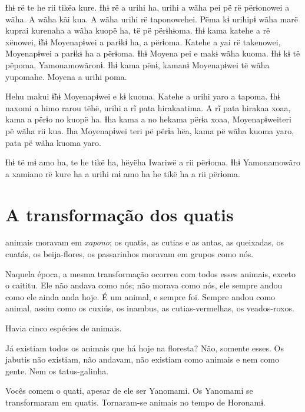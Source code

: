 Ɨhɨ rë te he rii tikëa kure. Ɨhɨ rë a urihi ha, urihi a wãha pei pë rë
 përɨonowei a wãha. A wãha kãi kua. A wãha urihi rë taponowehei. Pëma kɨ
 urihipɨ wãha marë kuprai kurenaha a wãha kuopë ha, të pë përɨhɨoma. Ɨhɨ
 kama katehe a rë xënowei, ɨ̃hɨ Moyenapɨwei a parɨkɨ ha, a përɨoma. Katehe
 a yai rë takenowei, Moyenapɨwei a parɨkɨ ha a përɨoma. Ɨhɨ Moyena pei e
 makɨ wãha kuoma. Ɨhɨ kɨ të pëpoma, Yamonamowãronɨ. Ɨhɨ kama pënɨ, kamanɨ
 Moyenapɨwei të wãha yupomahe. Moyena a urihi poma. 

Hehu makui ɨ̃hɨ Moyenapɨwei e kɨ kuoma. Katehe a urihi yaro a tapoma. Ɨhɨ
 naxomi a himo rarou tëhë, urihi a rĩ pata hirakaatima. A rĩ pata hirakaa
 xoaa, kama a përɨo no kuopë ha. Ɨha kama a no hekama përɨa xoaa,
 Moyenapɨweiteri pë wãha rii kua. Ɨha Moyenapɨwei teri pë përɨa hëa, kama
 pë wãha kuoma yaro, pata pë wãha kuoma yaro.

Ɨhɨ të mɨ amo ha, te he tikë ha, hëyëha Iwariwë a rii përɨoma. Ɨhɨ
 Yamonamowãro a xamiano rë kure ha a urihi mɨ amo ha he tikë ha a rii
 përɨoma.

 
\chapter{A transformação dos quatis}

 animais moravam em \textit{xapono}; os quatis, as cutias e as antas, as
queixadas, os cuatás, os beija-flores, os passarinhos moravam em grupos
como nós.

Naquela época, a mesma transformação ocorreu com todos esses animais,
exceto o caititu. Ele não andava como nós; não morava como nós, ele
sempre andou como ele ainda anda hoje. É um animal, e sempre foi. Sempre
andou como animal, assim como os cuxiús, os inambus, as cutias-vermelhas, os veados-roxos.

Havia cinco espécies de animais. 

Já existiam todos os animais que há hoje na floresta? Não, somente
esses. Os jabutis não existiam, não andavam, não existiam como animais e
nem como gente. Nem os tatus-galinha. 

Vocês comem o quati, apesar de ele ser Yanomami. Os Yanomami se
transformaram em quatis. Tornaram-se animais no tempo de Horonamɨ. 

